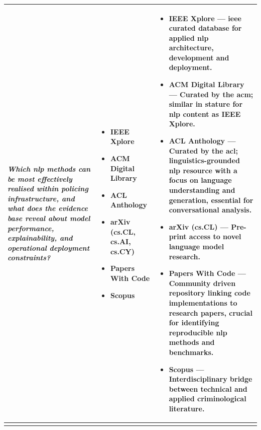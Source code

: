 \begin{longtable}{%
  >{\centering\arraybackslash}p{4.4cm}%
  >{\centering\arraybackslash}p{2.6cm}%
  >{\centering\arraybackslash}p{7.7cm}%
}
\textit{Which \gls{nlp} methods can be most effectively realised within policing
infrastructure, and what does the evidence base reveal about model performance,
explainability, and operational deployment constraints?} &
%
\begin{itemize}[leftmargin=*,nosep,topsep=2pt,partopsep=0pt,itemindent=0pt,align=left]
  \item IEEE Xplore
  \item ACM Digital Library
  \item ACL Anthology
  \item arXiv (cs.CL, cs.AI, cs.CY)
  \item Papers With Code
  \item Scopus
\end{itemize} &
%
\begin{itemize}[leftmargin=*,nosep,topsep=2pt,partopsep=0pt,itemindent=0pt,align=left]
  \item \textbf{IEEE Xplore} --- \gls{ieee} curated database for applied \gls{nlp} architecture, development and deployment.
  \item \textbf{ACM Digital Library} --- Curated by the \gls{acm}; similar in stature for \gls{nlp} content as \textbf{IEEE Xplore}.
  \item \textbf{ACL Anthology} --- Curated by the \gls{acl}; linguistics-grounded \gls{nlp} resource with a focus on language understanding and generation, essential for conversational analysis.
  \item \textbf{arXiv} (cs.CL) --- Pre-print access to novel language model research.
  \item \textbf{Papers With Code} --- Community driven repository linking code implementations to research papers, crucial for identifying reproducible \gls{nlp} methods and benchmarks.
  \item \textbf{Scopus} --- Interdisciplinary bridge between technical and applied criminological literature.
\end{itemize} \\[8pt]

\midrule


\multicolumn{3}{c}{%
  \cellcolor{rowshade}\textcolor{track3}{%
    \textbf{Track 3 \textemdash{} Organisational Structures \& Policing}}}\\[2pt]


\end{longtable}
